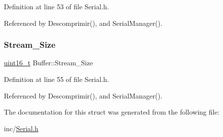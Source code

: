 Definition at line 53 of file Serial.\+h.



Referenced by Descomprimir(), and Serial\+Manager().

\mbox{\label{structBuffer_ad2ce1666d61d13e70634895da5a90696}} 
\subsubsection{\texorpdfstring{Stream\+\_\+\+Size}{Stream\_Size}}
{\footnotesize\ttfamily \mbox{\hyperlink{RegsLPC1769_8h_a273cf69d639a59973b6019625df33e30}{uint16\+\_\+t}} Buffer\+::\+Stream\+\_\+\+Size}



Definition at line 55 of file Serial.\+h.



Referenced by Descomprimir(), and Serial\+Manager().



The documentation for this struct was generated from the following file\+:\begin{DoxyCompactItemize}
\item 
inc/\mbox{\hyperlink{Serial_8h}{Serial.\+h}}\end{DoxyCompactItemize}
